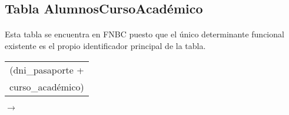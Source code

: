 \subsection{Tabla AlumnosCursoAcadémico}

  \paragraph{}Esta tabla se encuentra en FNBC puesto que el único
  determinante funcional existente es el propio identificador principal
  de la tabla.

 \begin{center}
    \begin{minipage}{4.2cm}{\begin{flushright}\begin{tabular}{ | c | }
                  \hline
                  (dni\_pasaporte + \\
                  curso\_académico) \\
                  \hline
                 \end{tabular}\end{flushright} }
    \end{minipage}
    \begin{minipage}{0.7cm}{$\longrightarrow$}
    \end{minipage}
    \begin{minipage}{5.9cm}{\begin{tabular}{ | c | }
                  \hline
                  \\
                  \hline
                 \end{tabular} }
    \end{minipage}
  \end{center}
